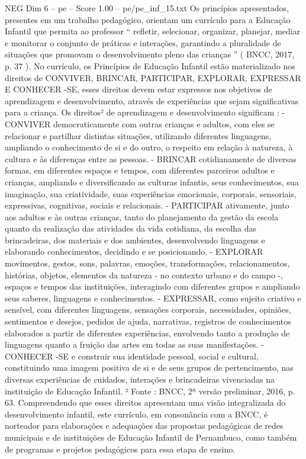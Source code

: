 \begin{textsample}{NEG Dim 6 – pe – Score 1.00 – pe/pe\_inf\_15.txt}
Os princípios apresentados, presentes em um trabalho pedagógico, orientam um currículo para a Educação Infantil que permita ao professor “ refletir, selecionar, organizar, planejar, mediar e monitorar o conjunto de práticas e interações, garantindo a pluralidade de situações que promovam o desenvolvimento pleno das crianças ” ( BNCC, 2017, p. 37 ).
No currículo, os Princípios de Educação Infantil estão materializado nos direitos de CONVIVER, BRINCAR, PARTICIPAR, EXPLORAR, EXPRESSAR E CONHECER -SE, esses direitos devem estar expressos nos objetivos de aprendizagem e desenvolvimento, através de experiências que sejam significativas para a criança.
Os direitos² de aprendizagem e desenvolvimento significam : - CONVIVER democraticamente com outras crianças e adultos, com eles se relacionar e partilhar distintas situações, utilizando diferentes linguagens, ampliando o conhecimento de si e do outro, o respeito em relação à natureza, à cultura e às diferenças entre as pessoas. - BRINCAR cotidianamente de diversas formas, em diferentes espaços e tempos, com diferentes parceiros adultos e crianças, ampliando e diversificando as culturas infantis, seus conhecimentos, sua imaginação, sua criatividade, suas experiências emocionais, corporais, sensoriais, expressivas, cognitivas, sociais e relacionais. - PARTICIPAR ativamente, junto aos adultos e às outras crianças, tanto do planejamento da gestão da escola quanto da realização das atividades da vida cotidiana, da escolha das brincadeiras, dos materiais e dos ambientes, desenvolvendo linguagens e elaborando conhecimentos, decidindo e se posicionando. - EXPLORAR movimentos, gestos, sons, palavras, emoções, transformações, relacionamentos, histórias, objetos, elementos da natureza - no contexto urbano e do campo -, espaços e tempos das instituições, interagindo com diferentes grupos e ampliando seus saberes, linguagens e conhecimentos. - EXPRESSAR, como sujeito criativo e sensível, com diferentes linguagens, sensações corporais, necessidades, opiniões, sentimentos e desejos, pedidos de ajuda, narrativas, registros de conhecimentos elaborados a partir de diferentes experiências, envolvendo tanto a produção de linguagens quanto a fruição das artes em todas as suas manifestações. - CONHECER -SE e construir sua identidade pessoal, social e cultural, constituindo uma imagem positiva de si e de seus grupos de pertencimento, nas diversas experiências de cuidados, interações e brincadeiras vivenciadas na instituição de Educação Infantil. ² Fonte : BNCC, 2ª versão preliminar, 2016, p. 63.
Compreendendo que esses direitos apresentam uma visão integralizada do desenvolvimento infantil, este currículo, em consonância com a BNCC, é norteador para elaborações e adequações das propostas pedagógicas de redes municipais e de instituições de Educação Infantil de Pernambuco, como também de programas e projetos pedagógicos para essa etapa de ensino.

\end{textsample}
